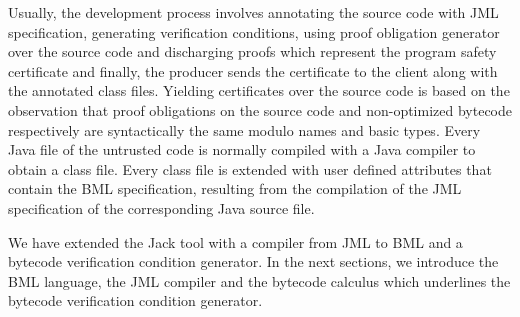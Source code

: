 Usually, the development process involves annotating the source code with JML specification,
 generating verification conditions, using proof obligation generator over the source code and 
discharging proofs which represent the program safety certificate and finally, the producer sends the certificate 
to the client along with the annotated class files.
 Yielding certificates over the source code is based on the observation that
 proof obligations on the source code and non-optimized bytecode respectively
 are syntactically the same modulo names and basic types. Every Java file of the 
untrusted code is normally compiled with a Java compiler to obtain a class file. Every class file is extended with
 user defined attributes that contain the BML specification, resulting from the compilation of the
 JML specification of the corresponding Java source file.

We have extended the Jack tool with a compiler from
 JML to BML and a bytecode verification condition generator. In the next sections, we introduce
 the BML language, the JML compiler and the bytecode \wpi calculus which underlines the bytecode verification condition generator.
 
